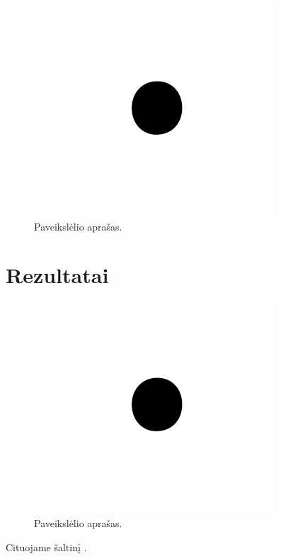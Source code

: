 \documentclass[conference]{IEEEtran}
\begin{document}
\begin{figure}[!h] %
\centerline{\includegraphics{fig1.png}}
\caption{Paveikslėlio aprašas.}
\label{fig}
\end{figure}


\section{Rezultatai}

\begin{figure}[ht] %
\centerline{\includegraphics{fig1.png}}
\caption{Paveikslėlio aprašas.}
\label{fig}
\end{figure}


\lipsum[2-10]






Cituojame šaltinį \cite{lecun2015deep}.



\end{document}
